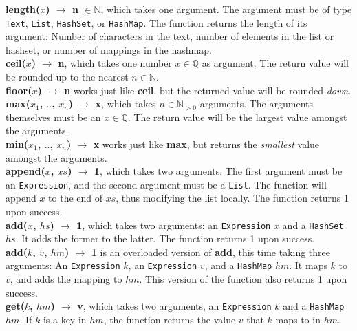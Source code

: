 \textbf{length($x$) $\xrightarrow{}$ n $\in \mathbb{N}$}, which takes one argument. The argument must be of type \texttt{Text}, \texttt{List}, \texttt{HashSet}, or \texttt{HashMap}. The function returns the length of its argument: Number of characters in the text, number of elements in the list or hashset, or number of mappings in the hashmap. \\

\textbf{ceil($x$) $\xrightarrow{}$ n}, which takes one number $x \in \mathbb{Q}$ as argument. The return value will be rounded up to the nearest $n \in \mathbb{N}$. \\

\textbf{floor($x$) $\xrightarrow{}$ n} works just like \textbf{ceil}, but the returned value will be rounded \textit{down}. \\

\textbf{max($x_{1}$, $..$, $x_{n}$) $\xrightarrow{}$ x}, which takes $n \in \mathbb{N}_{>0}$ arguments. The arguments themselves must be an $x \in \mathbb{Q}$. The return value will be the largest value amongst the arguments. \\

\textbf{min($x_{1}$, $..$, $x_{n}$) $\xrightarrow{}$ x} works just like \textbf{max}, but returns the \textit{smallest} value amongst the arguments. \\

\textbf{append($x$, $xs$) $\xrightarrow{}$ 1}, which takes two arguments. The first argument must be an \texttt{Expression}, and the second argument must be a \texttt{List}. The function will append $x$ to the end of $xs$, thus modifying the list locally. The function returns 1 upon success. \\

\textbf{add($x$, $hs$) $\xrightarrow{}$ 1}, which takes two arguments: an \texttt{Expression} $x$ and a \texttt{HashSet} $hs$. It adds the former to the latter. The function returns 1 upon success. \\

\textbf{add($k$, $v$, $hm$) $\xrightarrow{}$ 1} is an overloaded version of \textbf{add}, this time taking three arguments: An \texttt{Expression} $k$, an \texttt{Expression} $v$, and a \texttt{HashMap} $hm$. It maps $k$ to $v$, and adds the mapping to $hm$. This version of the function also returns 1 upon success. \\

\textbf{get($k$, $hm$) $\xrightarrow{}$ v}, which takes two arguments, an \texttt{Expression} $k$ and a \texttt{HashMap} $hm$. If $k$ is a key in $hm$, the function returns the value $v$ that $k$ maps to in $hm$. \\

